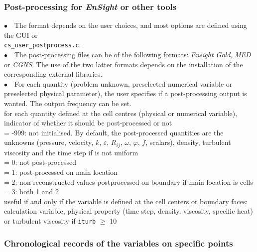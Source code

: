 \subsubsection{Post-processing for {\em EnSight} or other tools}

$\bullet\quad$The format depends on the user choices, and most options
are defined using the GUI or \\
\texttt{cs\_user\_postprocess.c}.\\
$\bullet\quad$The post-processing files can be of the following formats: {\em Ensight Gold},
{\em MED} or {\em CGNS}. The use of the two latter formats depends on
the installation of the corresponding external libraries.\\
$\bullet\quad$For each quantity (problem unknown, preselected numerical
variable or preselected physical parameter), the user specifies if a
post-processing output is wanted. The output frequency can be set.\\

{for each quantity defined at the cell centres (physical or numerical
variable), indicator of whether it should be post-processed or not \\
\hspace*{1.3cm}= -999: not initialised. By default, the post-processed
quantities are the unknowns (pressure, velocity, $k$, $\varepsilon$,
$R_{ij}$, $\omega$, $\varphi$, $\overline{f}$, scalars), density,
turbulent viscosity and the time step if is not uniform\\
\hspace*{1.3cm}= 0: not post-processed\\
\hspace*{1.3cm}= 1: post-processed on main location\\
\hspace*{1.3cm}= 2: non-reconstructed values postprocessed on boundary if main location is cells\\
\hspace*{1.3cm}= 3: both 1 and 2\\
useful if and only if the variable is defined at the cell centers or boundary faces:
calculation variable, physical property (time step, density,
viscosity, specific heat) or turbulent viscosity if {\tt iturb}
$\geqslant$ 10}

\subsubsection{Chronological records of the variables on specific points}

